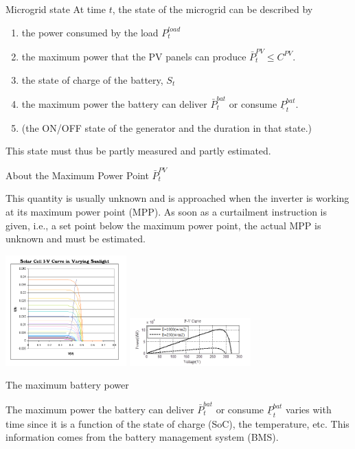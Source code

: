 \begin{frame}{Microgrid state}
At time $t$, the state of the microgrid can be described by
\begin{enumerate}
 \item the power consumed by the load $P^{load}_t$ %
 \item the maximum power that the PV panels can produce $\bar{P}^{PV}_t \leq C^{PV}$. 
 \item the state of charge of the battery, $S_t$
 \item the maximum power the battery can deliver $\bar{P}^{bat}_t$ or consume $\underline{P}^{bat}_t$. 
 \item (the ON/OFF state of the generator and the duration in that state.)
\end{enumerate}
This state must thus be partly measured and partly estimated.
\end{frame}

\begin{frame}{About the Maximum Power Point $\bar{P}^{PV}_t$}

    This quantity is usually unknown and is approached when the inverter is working at its maximum power point (MPP). As soon as a curtailment instruction is given, i.e., a set point below the maximum power point, the actual MPP is unknown and must be estimated. 

    \begin{center}    
    \includegraphics[width=0.35\textwidth]{images/Solar-Cell-IV-curve-with-MPP.png}%
    \includegraphics[width=0.35\textwidth]{images/Power-voltage_(P_-V)_curve.png}    
    \end{center}


\end{frame}
\begin{frame}{The maximum battery power}

The maximum power the battery can deliver $\bar{P}^{bat}_t$ or consume $\underline{P}^{bat}_t$ varies with time since it is a function of the state of charge (SoC), the temperature, etc. This information comes from the battery management system (BMS).
    
\end{frame}

